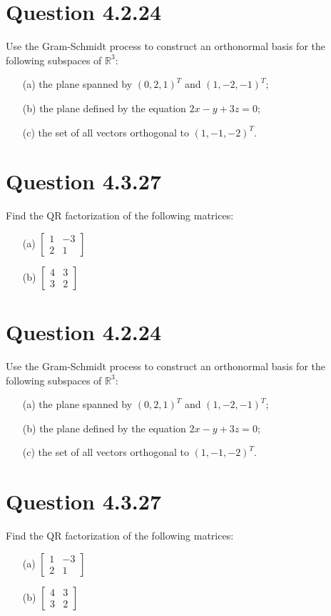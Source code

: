 \documentclass[12pt]{article}
\begin{document}
\section*{Question 4.2.24}
Use the Gram-Schmidt process to construct an orthonormal basis for the following subspaces of \( \mathbb{R}^3 \):
\begin{itemize}
    \item[(a)] the plane spanned by \( (0, 2, 1)^T \) and \( (1, -2, -1)^T \);
    \item[(b)] the plane defined by the equation \( 2x - y + 3z = 0 \);
    \item[(c)] the set of all vectors orthogonal to \( (1, -1, -2)^T \).
\end{itemize}

\section*{Question 4.3.27}
Find the QR factorization of the following matrices:
\begin{itemize}
    \item[(a)] \( \begin{bmatrix} 1 & -3 \\ 2 & 1 \end{bmatrix} \)
    \item[(b)] \( \begin{bmatrix} 4 & 3 \\ 3 & 2 \end{bmatrix} \)
\end{itemize}

\section*{Question 4.2.24}
Use the Gram-Schmidt process to construct an orthonormal basis for the following subspaces of \( \mathbb{R}^3 \):
\begin{itemize}
    \item[(a)] the plane spanned by \( (0, 2, 1)^T \) and \( (1, -2, -1)^T \);
    \item[(b)] the plane defined by the equation \( 2x - y + 3z = 0 \);
    \item[(c)] the set of all vectors orthogonal to \( (1, -1, -2)^T \).
\end{itemize}

\section*{Question 4.3.27}
Find the QR factorization of the following matrices:
\begin{itemize}
    \item[(a)] \( \begin{bmatrix} 1 & -3 \\ 2 & 1 \end{bmatrix} \)
    \item[(b)] \( \begin{bmatrix} 4 & 3 \\ 3 & 2 \end{bmatrix} \)
\end{itemize}
\end{document}

